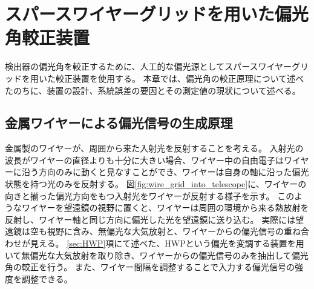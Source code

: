 \documentclass[../../main.tex]{subfiles}
\begin{document}
\chapter{スパースワイヤーグリッドを用いた偏光角較正装置}
\label{chap:wiregrid}
検出器の偏光角を較正するために、人工的な偏光源としてスパースワイヤーグリッドを用いた較正装置を使用する\cite{Tajima_2012}\cite{swg:Murata_2023}。
本章では、偏光角の較正原理について述べたのちに、装置の設計、系統誤差の要因とその測定値の現状について述べる。

\section{金属ワイヤーによる偏光信号の生成原理}
\label{sec:wiregrid_principle}
金属製のワイヤーが、周囲から来た入射光を反射することを考える。
入射光の波長がワイヤーの直径よりも十分に大きい場合、ワイヤー中の自由電子はワイヤーに沿う方向のみに動くと見なすことができ、ワイヤーは自身の軸に沿った偏光状態を持つ光のみを反射する。
図\ref{fig:wire_grid_into_telescope}に、ワイヤーの向きと揃った偏光方向をもつ入射光をワイヤーが反射する様子を示す。
このようなワイヤーを望遠鏡の視野に置くと、ワイヤーは周囲の環境から来る熱放射を反射し、ワイヤー軸と同じ方向に偏光した光を望遠鏡に送り込む。
実際には望遠鏡は空も視野に含み、無偏光な大気放射と、ワイヤーからの偏光信号の重ね合わせが見える。
\ref{sec:HWP}項にて述べた、HWPという偏光を変調する装置を用いて無偏光な大気放射を取り除き、ワイヤーからの偏光信号のみを抽出して偏光角の較正を行う。
また、ワイヤー間隔を調整することで入力する偏光信号の強度を調整できる。
\end{document}
